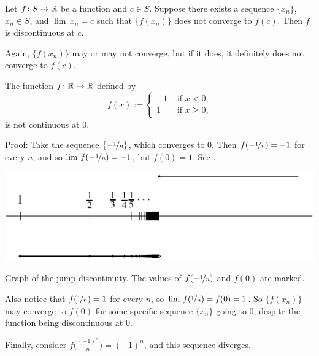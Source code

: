 \begin{prop}
Let $f \colon S \to {\mathbb{R}}$ be a function and $c \in S$.  Suppose 
there exists a sequence $\{ x_n \}$, $x_n \in S$, and $\lim\, x_n = c$
such that $\{ f(x_n) \}$ does not converge to $f(c)$.  Then $f$ is 
discontinuous at $c$.
\end{prop}

Again, 
$\{ f(x_n) \}$ may or may not converge, but
if it does, it definitely does not converge to
$f(c)$.

\begin{example} \label{example:jumpdiscont}
The function $f \colon {\mathbb{R}} \to {\mathbb{R}}$ defined by
\begin{equation*}
f(x) := 
\begin{cases}
-1 & \text{ if $x < 0$,} \\
1 & \text{ if $x \geq 0$,}
\end{cases}
\end{equation*}
is not continuous at 0.

Proof: Take the sequence $\{ - \nicefrac{1}{n} \}$, which converges to 0.  Then
$f(-\nicefrac{1}{n}) = -1$ for every $n$,
and so
$\lim\, f(-\nicefrac{1}{n}) = -1$, but $f(0) = 1$.  See
.

\begin{myfigureht}
\includegraphics{figures/jumpdiscont}
\caption{Graph of the jump discontinuity.  The values of
$f(-\nicefrac{1}{n})$ and $f(0)$ are marked.\label{fig:jumpdiscont}}
\end{myfigureht}

Also notice that $f(\nicefrac{1}{n}) = 1$ for every $n$,
so $\lim \, f(\nicefrac{1}{n}) = f(0) = 1$.  So
$\{ f(x_n) \}$ may converge to $f(0)$
for some specific
sequence $\{ x_n \}$ going to 0,
despite the function being discontinuous at 0.

Finally, consider $f\bigl(\frac{{(-1)}^n}{n}\bigr) = {(-1)}^n$,
and this sequence diverges.
\end{example}

